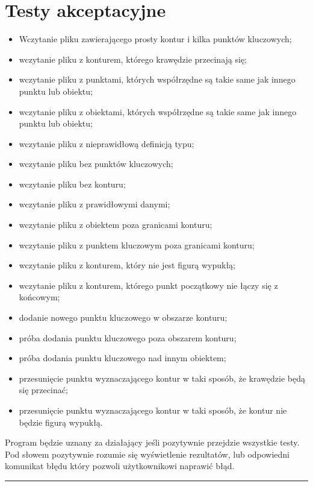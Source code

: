 \documentclass[a4paper,11pt]{article}
\newcommand{\linia}{\rule{\linewidth}{0.4mm}}
\begin{document}
\section{Testy akceptacyjne}
\begin{itemize}
\item Wczytanie pliku zawierającego prosty kontur i kilka punktów kluczowych;
\item wczytanie pliku z konturem, którego krawędzie przecinają się;
\item wczytanie pliku z punktami, których współrzędne są takie same jak innego punktu lub obiektu;
\item wczytanie pliku z obiektami, których współrzędne są takie same jak innego punktu lub obiektu;
\item wczytanie pliku z nieprawidłową definicją typu;
\item wczytanie pliku bez punktów kluczowych;
\item wczytanie pliku bez konturu;
\item wczytanie pliku z prawidłowymi danymi;
\item wczytanie pliku z obiektem poza granicami konturu;
\item wczytanie pliku z punktem kluczowym poza granicami konturu;
\item wczytanie pliku z konturem, który nie jest figurą wypukłą;
\item wczytanie pliku z konturem, którego punkt początkowy nie łączy się z końcowym;
\item dodanie nowego punktu kluczowego w obszarze konturu;
\item próba dodania punktu kluczowego poza obszarem konturu;
\item próba dodania punktu kluczowego nad innym obiektem;
\item przesunięcie punktu wyznaczającego kontur w taki sposób, że krawędzie będą się przecinać;
\item przesunięcie punktu wyznaczającego kontur w taki sposób, że kontur nie będzie figurą wypukłą.

\end{itemize}
Program będzie uznany za działający jeśli pozytywnie przejdzie wszystkie testy. Pod słowem pozytywnie rozumie się wyświetlenie rezultatów, lub odpowiedni komunikat błędu który pozwoli użytkownikowi naprawić błąd.
\noindent\linia
\end{document}
